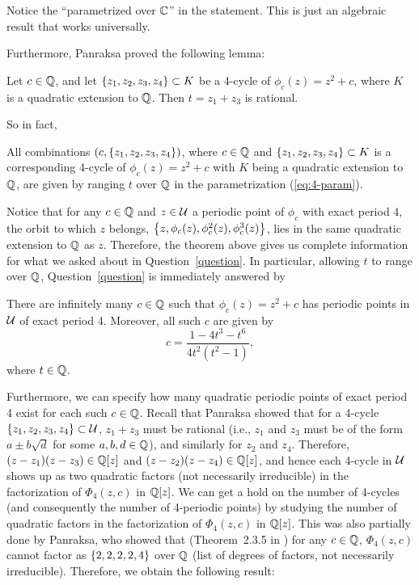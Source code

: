 \begin{remark}
  Notice the ``parametrized over $\mathbb{C}$'' in the statement. This is just
  an algebraic result that works universally.
\end{remark}

Furthermore, Panraksa \cite{MR2982105} proved the following lemma:

\begin{lemma}
  \label{lem:z1+z3}
  Let $c \in \mathbb{Q}$, and let $\left\{z_1, z_2, z_3, z_4\right\} \subset K$ be a
  4-cycle of $\phi_c(z) = z^2 + c$, where $K$ is a quadratic extension
  to $\mathbb{Q}$. Then $t = z_1 + z_3$ is rational.
\end{lemma}

So in fact,

\begin{theorem} 
  \label{th:all}
  All combinations $(c, \left\{z_1, z_2, z_3, z_4\right\})$, where $c \in \mathbb{Q}$
  and $\left\{z_1, z_2, z_3, z_4\right\} \subset K$ is a corresponding 4-cycle
  of $\phi_c(z) = z^2 + c$ with $K$ being a quadratic extension to
  $\mathbb{Q}$, are given by ranging $t$ over $\mathbb{Q}$ in the parametrization
  (\ref{eq:4-param}).
\end{theorem}

Notice that for any $c \in \mathbb{Q}$ and $z \in \mathcal{U}$ a periodic point of
$\phi_c$ with exact period 4, the orbit to which $z$ belongs, $\left\{z,
  \phi_c(z), \phi_c^2(z), \phi_c^3(z)\right\}$, lies in the same quadratic
extension to $\mathbb{Q}$ as $z$. Therefore, the theorem above gives us
complete information for what we asked about in
Question~\ref{question}. In particular, allowing $t$ to range over
$\mathbb{Q}$, Question~\ref{question} is immediately answered by

\begin{corollary}
  There are infinitely many $c \in \mathbb{Q}$ such that $\phi_c(z) = z^2 + c$
  has periodic points in $\mathcal{U}$ of exact period 4. Moreover, all such
  $c$ are given by
  \[
  \label{eq:c-param}
  c = \frac{1 - 4t^3 - t^6}{4t^2(t^2 - 1)},
  \]
  where $t \in \mathbb{Q}$.
\end{corollary}

Furthermore, we can specify how many quadratic periodic points of
exact period 4 exist for each such $c \in \mathbb{Q}$. Recall that Panraksa
showed that for a 4-cycle $\left\{z_1, z_2, z_3, z_4\right\} \subset \mathcal{U}$, $z_1
+ z_3$ must be rational (i.e., $z_1$ and $z_3$ must be of the form $a
\pm b \sqrt{d}$ for some $a, b, d \in \mathbb{Q}$), and similarly for $z_2$
and $z_4$. Therefore, $(z - z_1)(z - z_3) \in \mathbb{Q}[z]$ and $(z - z_2)(z
- z_4) \in \mathbb{Q}[z]$, and hence each 4-cycle in $\mathcal{U}$ shows up as two
quadratic factors (not necessarily irreducible) in the factorization
of $\Phi_4(z, c)$ in $\mathbb{Q}[z]$. We can get a hold on the number of
4-cycles (and consequently the number of 4-periodic points) by
studying the number of quadratic factors in the factorization of
$\Phi_4(z, c)$ in $\mathbb{Q}[z]$. This was also partially done by Panraksa,
who showed that (Theorem~2.3.5 in \cite{MR2982105}) for any $c \in
\mathbb{Q}$, $\Phi_4(z, c)$ cannot factor as $\left\{2, 2, 2, 2, 4\right\}$ over $\mathbb{Q}$
(list of degrees of factors, not necessarily irreducible). Therefore,
we obtain the following result:

